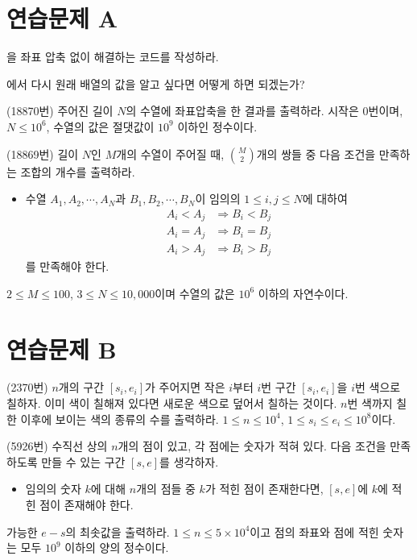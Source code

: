 \section{연습문제 A}
\begin{problem}
    을 좌표 압축 없이 해결하는 코드를 작성하라.
\end{problem}
\begin{problem}
    에서 다시 원래 배열의 값을 알고 싶다면 어떻게 하면 되겠는가?
\end{problem}

\begin{problem}
    (18870번) 주어진 길이 $N$의 수열에 좌표압축을 한 결과를 출력하라. 시작은 $0$번이며, $N \leq 10^6$, 수열의 값은 절댓값이 $10^9$ 이하인 정수이다.
\end{problem}

\begin{problem}
    (18869번) 길이 $N$인 $M$개의 수열이 주어질 때, $\binom{M}{2}$개의 쌍들 중 다음 조건을 만족하는 조합의 개수를 출력하라.
    \begin{itemize}
        \item 수열 $A_1, A_2, \cdots, A_N$과 $B_1, B_2, \cdots, B_N$이 임의의 $1 \leq i, j \leq N$에 대하여 
        \begin{align*}
            A_i < A_j &\Rightarrow B_i < B_j \\
            A_i = A_j &\Rightarrow B_i = B_j \\
            A_i > A_j &\Rightarrow B_i > B_j
        \end{align*}
        를 만족해야 한다.
    \end{itemize}
    $2 \leq M \leq 100$, $3 \leq N \leq 10,000$이며 수열의 값은 $10^6$ 이하의 자연수이다.
\end{problem}

\section{연습문제 B}

\begin{problem}
    (2370번) $n$개의 구간 $[s_i, e_i]$가 주어지면 작은 $i$부터 $i$번 구간 $[s_i, e_i]$을 $i$번 색으로 칠하자. 이미 색이 칠해져 있다면 새로운 색으로 덮어서 칠하는 것이다. $n$번 색까지 칠한 이후에 보이는 색의 종류의 수를 출력하라. $1 \leq n \leq 10^4$, $1 \leq s_i \leq e_i \leq 10^8$이다.
\end{problem}

\begin{problem} 
    (5926번) 수직선 상의 $n$개의 점이 있고, 각 점에는 숫자가 적혀 있다. 다음 조건을 만족하도록 만들 수 있는 구간 $[s, e]$를 생각하자.
    \begin{itemize}
        \item 임의의 숫자 $k$에 대해 $n$개의 점들 중 $k$가 적힌 점이 존재한다면, $[s, e]$에 $k$에 적힌 점이 존재해야 한다.
    \end{itemize}
    가능한 $e - s$의 최솟값을 출력하라. $1 \leq n \leq 5 \times 10^4$이고 점의 좌표와 점에 적힌 숫자는 모두 $10^9$ 이하의 양의 정수이다.
\end{problem}

